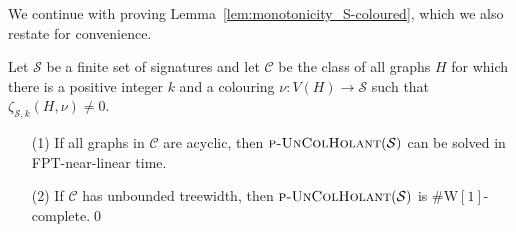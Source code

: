 \documentclass[authorcolumns,numberwithinsect]{no-lipics-v2022}
\newcommand{\W}{\mathrm{W}}
\begin{document}
We continue with proving Lemma~\ref{lem:monotonicity_S-coloured}, which we also restate for convenience.

\begin{lemma}
    Let $\mathcal{S}$ be a finite set of signatures and let $\mathcal{C}$ be the class of all graphs $H$ for which there is a positive integer $k$ and a colouring $\nu:V(H)\to \mathcal{S}$ such that $\zeta_{\mathcal{S},k}(H,\nu)\neq 0$.
    \begin{itemize}
        \item[(1)] If all graphs in $\mathcal{C}$ are acyclic, then  $\text{\sc{p-UnColHolant}}(\mathcal{S})$ can be solved in FPT-near-linear time.
        \item[(2)] If $\mathcal{C}$ has unbounded treewidth, then $\text{\sc{p-UnColHolant}}(\mathcal{S})$ is $\#\W[1]$-complete.\qed
    \end{itemize}
\end{lemma}
\end{document}
